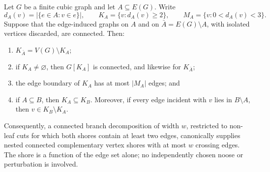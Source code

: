 \begin{theorem}
\label{thm:connected-edge-shore-majority}
\Sprose
Let \(G\) be a finite cubic graph and let \(A\subseteq E(G)\).  Write
\[
 d_A(v)=|\{e\in A:v\in e\}|,\qquad
 K_A=\{v:d_A(v)\ge2\},\qquad
 M_A=\{v:0<d_A(v)<3\}.
\]
Suppose that the edge-induced graphs on \(A\) and on
\(\bar A=E(G)\setminus A\), with isolated vertices discarded, are connected.
Then:
\begin{enumerate}
\item \(K_{\bar A}=V(G)\setminus K_A\);
\item if \(K_A\ne\varnothing\), then \(G[K_A]\) is connected, and likewise
      for \(K_{\bar A}\);
\item the edge boundary of \(K_A\) has at most \(|M_A|\) edges; and
\item if \(A\subseteq B\), then \(K_A\subseteq K_B\).  Moreover, if every
      edge incident with \(v\) lies in \(B\setminus A\), then
      \(v\in K_B\setminus K_A\).
\end{enumerate}
Consequently, a connected branch decomposition of width \(w\), restricted
to non-leaf cuts for which both shores contain at least two edges,
canonically supplies nested connected complementary vertex shores with at
most \(w\) crossing edges.  The shore is a function of the edge set alone;
no independently chosen noose or perturbation is involved.
\end{theorem}

